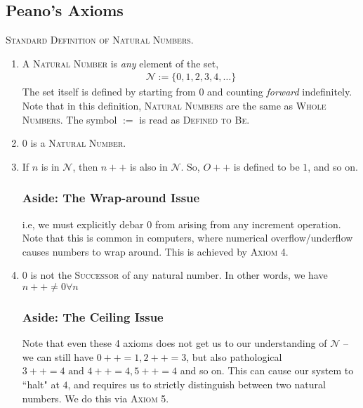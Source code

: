 \documentclass[multi, tikz, 11pt]{article}
\begin{document}
\subsection{Peano's Axioms}
\textsc{\color{red}Standard Definition of Natural Numbers}.
\begin{enumerate}
    \item A \textsc{Natural Number} is \textit{any} element of the set, 
    \begin{gather}
        \mathcal{N}:= \{0, 1, 2, 3, 4, \dots\}
        \end{gather}
    The set itself is defined by {\color{red}starting from $0$ and counting \textit{forward} indefinitely}. Note that in this definition, \textsc{Natural Numbers} are the same as \textsc{Whole Numbers}. The symbol $:=$ is read as \textsc{Defined to Be}.

    \item $0$ is a \textsc{Natural Number}.
    \item If $n$ is in $\mathcal{N}$, then $n++$ is also in $\mathcal{N}$.
    {} So, $O++$ is defined to be $1$, and so on.\vspace{-8pt}
\subsubsection{Aside: The Wrap-around Issue} i.e, we must explicitly debar $0$ from arising from any increment operation. {\color{red} Note that this is common in computers, where numerical overflow/underflow causes numbers to wrap around.} This is achieved by \textsc{Axiom 4}.

\item $0$ is not the \textsc{Successor} of any natural number. In other words, we have \textsc{\color{red}$n++ \neq 0 \forall n$}\vspace{-8pt}
\subsubsection{Aside: The Ceiling Issue}\vspace{-8pt} Note that even these 4 axioms does not get us to our understanding of $\mathcal{N}$ -- we can still have $0++ = 1, 2++ = 3$, but also pathological $3++ = 4 \text{ and } 4++ = 4, 5++ = 4$ and so on. This can cause our system to ``halt" at $4$, and requires us to strictly distinguish between two natural numbers. We do this via \textsc{Axiom 5}.


\end{enumerate}
\end{document}
